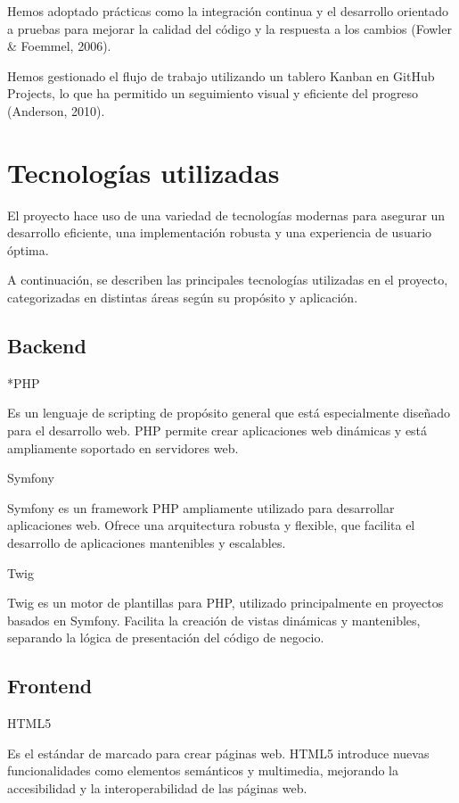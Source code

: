 Hemos adoptado prácticas como la integración continua y el desarrollo orientado a pruebas para mejorar la
calidad del código y la respuesta a los cambios (Fowler \& Foemmel, 2006).

Hemos gestionado el flujo de trabajo utilizando un tablero Kanban en GitHub Projects, lo que ha permitido un seguimiento
visual y eficiente del progreso (Anderson, 2010).


\section{Tecnologías utilizadas}
El proyecto hace uso de una variedad de tecnologías modernas para asegurar un desarrollo eficiente,
una implementación robusta y una experiencia de usuario óptima.

A continuación, se describen las principales tecnologías utilizadas en
el proyecto, categorizadas en distintas áreas según su propósito y aplicación.

\subsection{Backend}

*PHP

Es un lenguaje de scripting de propósito general que está especialmente diseñado para el desarrollo web.
PHP permite crear aplicaciones web dinámicas y está ampliamente soportado en servidores web.

Symfony

Symfony es un framework PHP ampliamente utilizado para desarrollar aplicaciones web.
Ofrece una arquitectura robusta y flexible, que facilita el desarrollo de aplicaciones mantenibles y escalables.

Twig

Twig es un motor de plantillas para PHP, utilizado principalmente en proyectos basados en
Symfony.
Facilita la creación de vistas dinámicas y mantenibles, separando la lógica de presentación del código de negocio.

\subsection{Frontend}

HTML5

Es el estándar de marcado para crear páginas web.
HTML5 introduce nuevas funcionalidades como elementos semánticos y multimedia, mejorando la accesibilidad y la
interoperabilidad de las páginas web.

